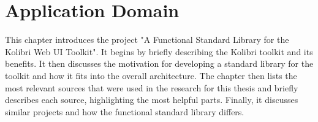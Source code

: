 \chapter{Application Domain}
\label{chap:application_domain}
This chapter introduces the project "A Functional Standard Library for the
Kolibri Web UI Toolkit". It begins by briefly describing the Kolibri toolkit
and its benefits. It then discusses the motivation for developing a standard
library for the toolkit and how it fits into the overall architecture. The
chapter then lists the most relevant sources that were used in the research for
this thesis and briefly describes each source, highlighting the most helpful parts. 
Finally, it discusses similar projects and how the functional standard library differs.



